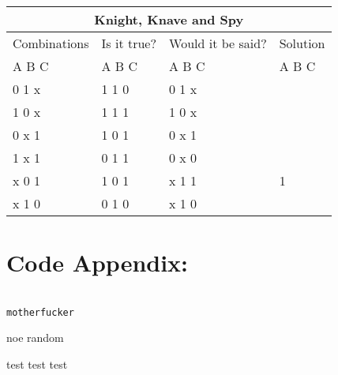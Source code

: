 \documentclass[11pt]{amsart}
\begin{document}
	\begin{tabular}{ |p{3cm}||p{3cm}|p{3cm}|p{3cm}|  }
	 \hline
	 \multicolumn{4}{|c|}{Knight, Knave and Spy} \\
	 \hline
	 Combinations & Is it true? & Would it be said? & Solution  \\ A  B  C   &   A  B  C  &   A  B  C & A  B  C \\
	 \hline
	  0   1   x  	& 1	1	0   & 0 1 x	&  \\
	  1   0   x		& 1	1	1  	& 1 0 x &  \\
	  0   x   1 	&	1	0	1 	& 0 x 1	&  \\
	  1   x   1  	&	0	1	1 	& 0 x 0	&  \\
	  x   0   1		& 1	0	1  	& x 1 1	& 1\\
	  x   1   0		& 0	1	0  	& x 1 0 &  \\

	 \hline
	\end{tabular}


\section{Code Appendix:}

\begin{verbatim}

motherfucker

\end{verbatim}






noe random


test
test
test
\end{document}
